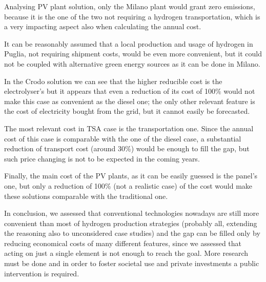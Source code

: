 Analysing PV plant solution, only the Milano plant would grant zero emissions, because it is the one of the two not requiring a hydrogen transportation, which is a very impacting aspect also when calculating the annual cost.

It can be reasonably assumed that a local production and usage of hydrogen in Puglia, not requiring shipment costs, would be even more convenient, but it could not be coupled with alternative green energy sources as it can be done in Milano.

In the Crodo solution we can see that the higher reducible cost is the electrolyser’s but it appears that even a reduction of its cost of 100\% would not make this case as convenient as the diesel one; the only other relevant feature is the cost of electricity bought from the grid, but it cannot easily be forecasted.

The most relevant cost in TSA case is the transportation one. Since the annual cost of this case is comparable with the one of the diesel case, a substantial reduction of transport cost (around 30\%) would be enough to fill the gap, but such price changing is not to be expected in the coming years.

Finally, the main cost of the PV plants, as it can be easily guessed is the panel’s one, but only a reduction of 100\% (not a realistic case) of the cost would make these solutions comparable with the traditional one.

In conclusion, we assessed that conventional technologies nowadays are still more convenient than most of hydrogen production strategies (probably all, extending the reasoning also to unconsidered case studies) and the gap can be filled only by reducing economical costs of many different features, since we assessed that acting on just a single element is not enough to reach the goal. More research must be done and in order to foster societal use and private investments a public intervention is required.